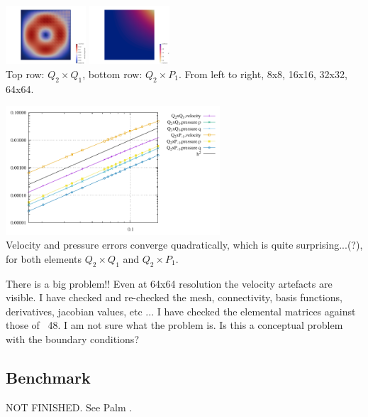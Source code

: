 \begin{center}
\includegraphics[width=3cm]{python_codes/fieldstone_107/results/mms/q2p1/vel64}
\includegraphics[width=3cm]{python_codes/fieldstone_107/results/mms/q2p1/q64}\\
{\captionfont Top row: $Q_2\times Q_1$, bottom row: $Q_2\times P_1$. From left to right, 8x8,
16x16, 32x32, 64x64. }
\end{center}

\begin{center}
\includegraphics[width=8cm]{python_codes/fieldstone_107/results/mms/errors.pdf}\\
{\captionfont Velocity and pressure errors converge quadratically, which is quite
surprising...(?), for both elements $Q_2\times Q_1$ and $Q_2\times P_1$.}
\end{center}

{\color{orange} There is a big problem!! Even at 64x64 resolution the velocity artefacts 
are visible. I have checked and re-checked the mesh, connectivity, basis functions, 
derivatives, jacobian values, etc ... I have checked the elemental matrices against those of 
\stone~48. I am not sure what the problem is. Is this a conceptual
problem with the boundary conditions? }



\subsection*{Benchmark}

NOT FINISHED. See Palm . 

